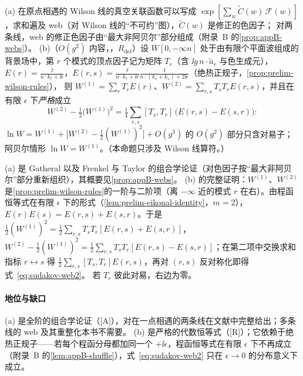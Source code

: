 \begin{proposition}\label{prop:sudakov-webs}
(a) 在原点相遇的 Wilson 线的真空关联函数可以写成 $\exp[\sum_w\tilde C(w)\,\mathcal F(w)]$，求和遍及 web（对 Wilson 线的“不可约”图），$\tilde C(w)$ 是修正的色因子；
对两条线，web 的修正色因子由“最大非阿贝尔”部分组成\cite{Gatheral1983,FrenkelTaylor1984}（附录~B 的\cref{prop:appB-webs}）。
(b)（$O(g^2)$ 内容，\tagR，$R_{\mathrm{def}}$）设 $W[0,-\infty n]$ 处于由有限个平面波组成的背景场中，第 $r$ 个模式的顶点因子记为矩阵 $T_r$（含 $\ii g\,n\cdot\tilde a_r$ 与色生成元），
$E(r)=\frac{\ii}{n\cdot k_r+\ii\epsilon}$，$E(r,s)=\frac{\ii}{n\cdot k_r+\ii\epsilon}\frac{\ii}{n\cdot(k_r+k_s)+2\ii\epsilon}$（绝热正规子，\cref{prop:prelim-wilson-rules}），
则 $W^{(1)}=\sum_rT_rE(r)$、$W^{(2)}=\sum_{r,s}T_sT_rE(r,s)$，并且在有限 $\epsilon$ 下\emph{严格}成立
\begin{equation}\label{eq:sudakov-web2}
W^{(2)}-\tfrac12\big(W^{(1)}\big)^2=\tfrac14\sum_{r,s}[T_s,T_r]\,\big(E(r,s)-E(s,r)\big):
\end{equation}
$\ln W=W^{(1)}+\big[W^{(2)}-\frac12(W^{(1)})^2\big]+O(g^3)$ 的 $O(g^2)$ 部分只含对易子；阿贝尔情形 $\ln W=W^{(1)}$。（本命题只涉及 Wilson 线算符。）
\end{proposition}

\begin{proofsketch}
(a) 是 Gatheral 以及 Frenkel 与 Taylor 的组合学论证（对色因子按“最大非阿贝尔”部分重新组织），其概要见\cref{prop:appB-webs}。
(b) 的完整证明：$W^{(1)}$、$W^{(2)}$ 是\cref{prop:prelim-wilson-rules}的一阶与二阶项（离 $-\infty$ 近的模式 $r$ 在右）。由程函恒等式在有限 $\epsilon$ 下的形式（\cref{lem:prelim-eikonal-identity}，$m=2$），
$E(r)E(s)=E(r,s)+E(s,r)$。于是 $\frac12(W^{(1)})^2=\frac12\sum_{r,s}T_sT_r[E(r,s)+E(s,r)]$，
$W^{(2)}-\frac12(W^{(1)})^2=\frac12\sum_{r,s}T_sT_r[E(r,s)-E(s,r)]$；在第二项中交换求和指标 $r\leftrightarrow s$ 得 $\frac12\sum_{r,s}[T_s,T_r]E(r,s)$，再对 $(r,s)$ 反对称化即得式~\eqref{eq:sudakov-web2}。
若 $T_r$ 彼此对易，右边为零。
\end{proofsketch}

\paragraph{地位与缺口}(a) 是全阶的组合学论证（[A]），对在一点相遇的两条线在文献中完整给出\cite{Gatheral1983,FrenkelTaylor1984}；多条线的 web 及其重整化本书不需要。
(b) 是严格的代数恒等式（[R]）；它依赖于绝热正规子——若每个程函分母都加同一个 $+\ii\epsilon$，程函恒等式在有限 $\epsilon$ 下不再成立（附录~B 的\cref{lem:appB-shuffle}），式~\eqref{eq:sudakov-web2} 只在 $\epsilon\to0$ 的分布意义下成立。

